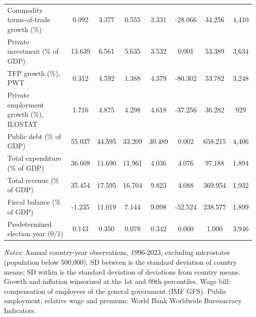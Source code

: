 \begin{table}[htbp]
\begin{tabular}{l*{7}{c}}
Commodity terms-of-trade growth (\%) & 0.092 & 3.377 & 0.555 & 3.331 & -28.066 & 34.256 & 4,410 \\
Private investment (\% of GDP) & 13.639 & 6.561 & 5.635 & 3.532 & 0.001 & 53.389 & 3,634 \\
TFP growth (\%), PWT & 0.312 & 4.592 & 1.388 & 4.379 & -80.302 & 53.782 & 3,248 \\
Private employment growth (\%), ILOSTAT & 1.716 & 4.875 & 4.298 & 4.618 & -37.256 & 36.282 & 929 \\
Public debt (\% of GDP) & 55.037 & 44.595 & 33.209 & 30.489 & 0.002 & 658.215 & 4,406 \\
Total expenditure (\% of GDP) & 36.608 & 11.690 & 11.961 & 4.036 & 4.076 & 97.188 & 1,894 \\
Total revenue (\% of GDP) & 35.454 & 17.595 & 16.704 & 9.823 & 4.088 & 369.954 & 1,932 \\
Fiscal balance (\% of GDP) & -1.235 & 11.019 & 7.144 & 9.098 & -52.524 & 238.577 & 1,899 \\
Predetermined election year (0/1) & 0.143 & 0.350 & 0.078 & 0.342 & 0.000 & 1.000 & 3,946 \\
\bottomrule
\end{tabular}
\begin{minipage}{0.95\linewidth}\vspace{4pt}\scriptsize \textit{Notes:} Annual country-year observations, 1996-2023, excluding microstates (population below 500,000). SD between is the standard deviation of country means; SD within is the standard deviation of deviations from country means. Growth and inflation winsorized at the 1st and 99th percentiles. Wage bill: compensation of employees of the general government (IMF GFS). Public employment, relative wage and premium: World Bank Worldwide Bureaucracy Indicators.\end{minipage}
\end{table}
